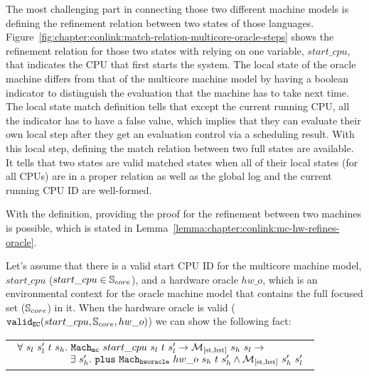 The most challenging part in connecting those two different machine models is defining the refinement relation between two states of those languages. 
Figure~\ref{fig:chapter:conlink:match-relation-multicore-oracle-steps} shows the 
refinement relation for those two states with relying on one variable, $start\_cpu$, that indicates the CPU that first starts the system. 
The local state of the oracle machine differs from that of the multicore machine model by having a boolean indicator 
to distinguish the evaluation that the machine has to take next time.
The local state match definition tells that except the current running CPU, all the indicator has to have a false value,
which implies that they can evaluate their own local step after they get an evaluation control via a scheduling result.
 With this local step, 
defining the match relation between two full states are available.
 It tells that 
 two states are valid matched states when all of their local states (for all CPUs) are in a proper relation as well as the global log and the current running CPU ID are well-formed. 


%
%

With the definition, providing the proof for the refinement between two machines is possible,
which is stated in Lemma~\ref{lemma:chapter:conlink:mc-hw-refines-oracle}.
\begin{lemma}
\label{lemma:chapter:conlink:mc-hw-refines-oracle}
Let's assume that there is a valid start CPU ID for the multicore machine model, 
$start\_cpu$ ($start\_cpu \in {\mathbb{S}_{core}}$), and a hardware oracle $hw\_o$,  
which is an environmental context for the oracle machine model that contains the full focused set (${\mathbb{S}_{core}}$) in it.
When the hardware oracle is valid ($ {{\mathrm{\texttt{valid}}}_{{\mathrm{\texttt{EC}}}}}({start\_cpu}, {{\mathbb{S}_{core}}}, {hw\_o})$) we can show the following fact:
\begin{center}
\begin{tabular}{P{0.95\textwidth}}
$
\begin{array}{l}
\forall \ s_l \ s_l' \ t \ s_h . \ \hardwarestep{start\_cpu}{s_l}{t}{s_l'} \rightarrow  \matchstatehstate{s_h}{s_l} \rightarrow \\
\ \ \ \ \ \ \ \ \ \ \ \ \ \ \ \ \exists\ s_h' . \  \ccplusstep{\oraclestep{hw\_o}{s_h}{t}{s_h'}} \wedge  \matchstatehstate{s_h'}{s_l'}\\
\end{array}
$
\end{tabular}
\end{center}
\end{lemma}

